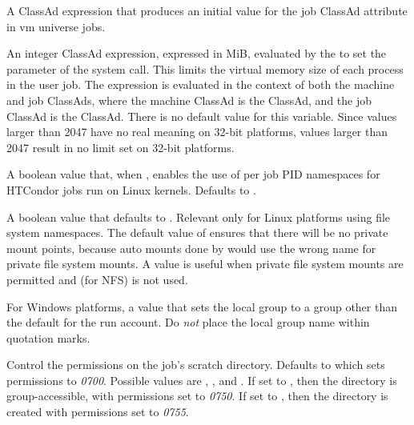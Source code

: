 \begin{description}
\label{param:MemoryUsageMetricVM} 
\item[\Macro{MEMORY\_USAGE\_METRIC\_VM}]
  A ClassAd expression that produces an initial value for the job ClassAd
  attribute  in vm universe jobs.

\label{param:StarterRlimitAs} 
\item[ \Macro{STARTER\_RLIMIT\_AS}]
  An integer ClassAd expression, 
  expressed in MiB,
  evaluated by the  to set the  parameter
  of the  system call.
  This limits the virtual memory size of each process in the user job.  
  The expression is
  evaluated in the context of both the machine and job ClassAds,
  where the machine ClassAd is the  ClassAd,
  and the job ClassAd is the  ClassAd.
  There is no default value for this variable.
  Since values larger than 2047 have no real meaning on 32-bit platforms,
  values larger than 2047 result in no limit set on 32-bit platforms.

\label{param:UsePidNamespaces} 
\item[ \Macro{USE\_PID\_NAMESPACES}]
  A boolean value that, when , enables the use of per job PID
  namespaces for HTCondor jobs run on Linux kernels.
  Defaults to .

\label{param:PerJobNamespaces} 
\item[ \Macro{PER\_JOB\_NAMESPACES}]
  A boolean value that defaults to .
  Relevant only for Linux platforms using file system namespaces.
  The default value of  ensures that there will be no
  private mount points, because auto mounts done by  
  would use the wrong name for private file system mounts. 
  A  value is useful when private file system mounts are
  permitted and  (for NFS) is not used.

\label{param:DynamicRunAccountLocalGroup} 
\item[\Macro{DYNAMIC\_RUN\_ACCOUNT\_LOCAL\_GROUP}]
  For Windows platforms, a value that sets the local group to a group other 
  than the default  for the  run account.
  Do \emph{not} place the local group name within quotation marks.

\label{param:JobExecdirPermissions}
\item[\Macro{JOB\_EXECDIR\_PERMISSIONS}]
  Control the permissions on the job's scratch directory. Defaults to
   which sets permissions to \emph{0700}. Possible values are
  , , and . 
  If set to , then the directory is group-accessible, 
  with permissions set to \emph{0750}.
  If set to ,
  then the directory is created with permissions set to \emph{0755}.


\end{description}

